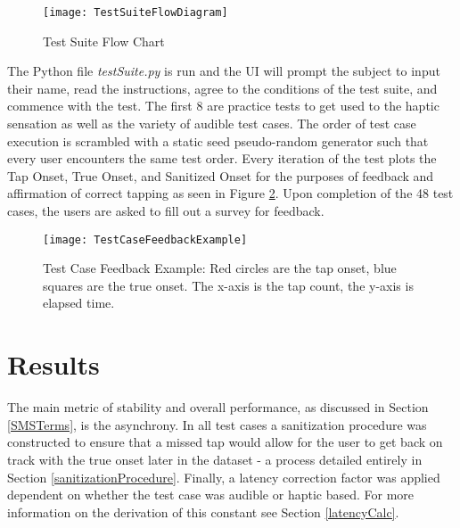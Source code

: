 \begin{figure}[H]
    \centering
    \texttt{[image: TestSuiteFlowDiagram]}
    \caption{Test Suite Flow Chart}
    \label{fig:TestSuiteFlowDiagram}
\end{figure}

The Python file \textit{testSuite.py} is run and the UI will prompt the subject to input their name, read the instructions, agree to the conditions of the test suite, and commence with the test. The first 8 are practice tests to get used to the haptic sensation as well as the variety of audible test cases. The order of test case execution is scrambled with a static seed pseudo-random generator such that every user encounters the same test order. Every iteration of the test plots the Tap Onset, True Onset, and Sanitized Onset  for the purposes of feedback and affirmation of correct tapping as seen in Figure \ref{fig:TestCaseFeedbackEx}. Upon completion of the 48 test cases, the users are asked to fill out a survey for feedback.

\begin{figure}[]
    \centering
    \texttt{[image: TestCaseFeedbackExample]}
    \caption{Test Case Feedback Example: Red circles are the tap onset, blue squares are the true onset. The x-axis is the tap count, the y-axis is elapsed time.}
    \label{fig:TestCaseFeedbackEx}
\end{figure}

\section{Results}\label{Results}
The main metric of stability and overall performance, as discussed in Section \ref{SMSTerms}, is the asynchrony. In all test cases a sanitization procedure was constructed to ensure that a missed tap would allow for the user to get back on track with the true onset later in the dataset - a process detailed entirely in Section \ref{sanitizationProcedure}. Finally, a latency correction factor was applied dependent on whether the test case was audible or haptic based. For more information on the derivation of this constant see Section \ref{latencyCalc}.

